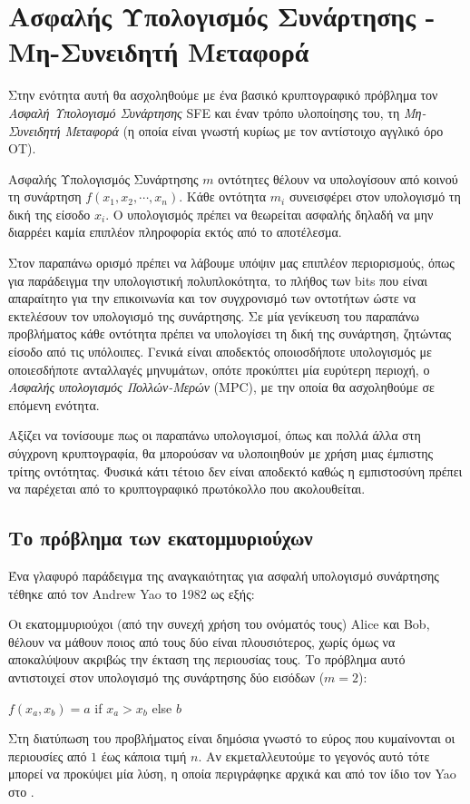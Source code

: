 \section{Ασφαλής Υπολογισμός Συνάρτησης - Μη-Συνειδητή Μεταφορά}
\label{sec:OT}
Στην ενότητα αυτή θα ασχοληθούμε με ένα βασικό κρυπτογραφικό πρόβλημα τον \emph{Ασφαλή Υπολογισμό Συνάρτησης} \gls{SFE} και έναν τρόπο υλοποίησης του, τη \emph{Μη-Συνειδητή Μεταφορά} (η οποία είναι γνωστή κυρίως με τον αντίστοιχο αγγλικό όρο \gls{OT}). 

\begin{definition}{Ασφαλής Υπολογισμός Συνάρτησης}
$m$ οντότητες θέλουν να υπολογίσουν από κοινού τη συνάρτηση $f(x_1,x_2,\cdots,x_n)$. Κάθε οντότητα $m_i$ συνεισφέρει στον υπολογισμό τη δική της είσοδο $x_i$. Ο υπολογισμός πρέπει να θεωρείται ασφαλής δηλαδή να μην διαρρέει καμία επιπλέον πληροφορία εκτός από το αποτέλεσμα. 
\end{definition}

Στον παραπάνω ορισμό πρέπει να λάβουμε υπόψιν μας επιπλέον περιορισμούς, όπως για παράδειγμα την υπολογιστική πολυπλοκότητα, το πλήθος των bits που είναι απαραίτητο για την επικοινωνία και τον συγχρονισμό των οντοτήτων ώστε να εκτελέσουν τον υπολογισμό της συνάρτησης. Σε μία γενίκευση του παραπάνω προβλήματος κάθε οντότητα πρέπει να υπολογίσει τη δική της συνάρτηση, ζητώντας είσοδο από τις υπόλοιπες. Γενικά είναι αποδεκτός οποιοσδήποτε υπολογισμός με οποιεσδήποτε ανταλλαγές μηνυμάτων, οπότε προκύπτει μία ευρύτερη περιοχή, ο \emph{Ασφαλής υπολογισμός Πολλών-Μερών} (\gls{MPC}), με την οποία θα ασχοληθούμε σε επόμενη ενότητα. 

Αξίζει να τονίσουμε πως οι παραπάνω υπολογισμοί, όπως και πολλά άλλα στη σύγχρονη κρυπτογραφία, θα μπορούσαν να υλοποιηθούν με χρήση μιας έμπιστης τρίτης οντότητας. Φυσικά κάτι τέτοιο δεν είναι αποδεκτό καθώς η εμπιστοσύνη πρέπει να παρέχεται από το κρυπτογραφικό πρωτόκολλο που ακολουθείται. 

\subsection{Το πρόβλημα των εκατομμυριούχων}

Ένα γλαφυρό παράδειγμα της αναγκαιότητας για ασφαλή υπολογισμό συνάρτησης τέθηκε από τον Andrew Yao \cite{yao_protocols_1982} το 1982 ως εξής: 

Οι εκατομμυριούχοι (από την συνεχή χρήση του ονόματός τους) Alice και Bob, θέλουν να μάθουν ποιος από τους δύο είναι πλουσιότερος, χωρίς όμως να αποκαλύψουν ακριβώς την έκταση της περιουσίας τους. Το πρόβλημα αυτό αντιστοιχεί στον υπολογισμό της συνάρτησης δύο εισόδων ($m=2$):
\begin{center}
$f(x_a,x_b) = a$ if $x_a > x_b$ else $b$
\end{center}
Στη διατύπωση του προβλήματος είναι δημόσια γνωστό το εύρος που κυμαίνονται οι περιουσίες από $1$ έως κάποια τιμή $n$. Αν εκμεταλλευτούμε το γεγονός αυτό τότε μπορεί να προκύψει μία λύση, η οποία περιγράφηκε αρχικά και από τον ίδιο τον Yao στο \cite{yao_protocols_1982}.

